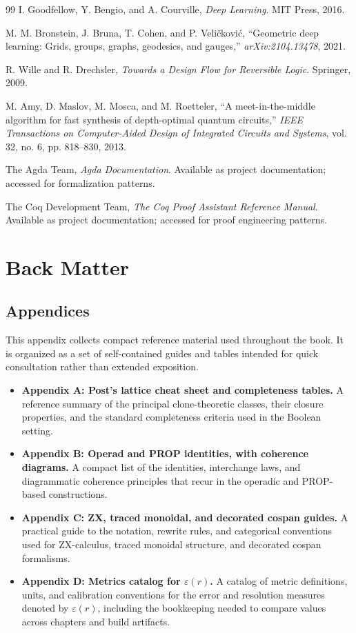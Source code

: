 \documentclass[11pt]{article}
\begin{document}
\begin{thebibliography}{99}
 I. Goodfellow, Y. Bengio, and A. Courville, \emph{Deep Learning}. MIT Press, 2016.

 M. M. Bronstein, J. Bruna, T. Cohen, and P. Veli\v{c}kovi\'c, ``Geometric deep learning: Grids, groups, graphs, geodesics, and gauges,'' \emph{arXiv:2104.13478}, 2021.

 R. Wille and R. Drechsler, \emph{Towards a Design Flow for Reversible Logic}. Springer, 2009.

 M. Amy, D. Maslov, M. Mosca, and M. Roetteler, ``A meet-in-the-middle algorithm for fast synthesis of depth-optimal quantum circuits,'' \emph{IEEE Transactions on Computer-Aided Design of Integrated Circuits and Systems}, vol. 32, no. 6, pp. 818--830, 2013.

 The Agda Team, \emph{Agda Documentation}. Available as project documentation; accessed for formalization patterns.

 The Coq Development Team, \emph{The Coq Proof Assistant Reference Manual}. Available as project documentation; accessed for proof engineering patterns.

\end{thebibliography}


\section{Back Matter}

\subsection{Appendices}

This appendix collects compact reference material used throughout the book. It is organized as a set of self-contained guides and tables intended for quick consultation rather than extended exposition.

\begin{itemize}
  \item \textbf{Appendix A: Post's lattice cheat sheet and completeness tables.} A reference summary of the principal clone-theoretic classes, their closure properties, and the standard completeness criteria used in the Boolean setting.
  \item \textbf{Appendix B: Operad and PROP identities, with coherence diagrams.} A compact list of the identities, interchange laws, and diagrammatic coherence principles that recur in the operadic and PROP-based constructions.
  \item \textbf{Appendix C: ZX, traced monoidal, and decorated cospan guides.} A practical guide to the notation, rewrite rules, and categorical conventions used for ZX-calculus, traced monoidal structure, and decorated cospan formalisms.
  \item \textbf{Appendix D: Metrics catalog for $\varepsilon(r)$.} A catalog of metric definitions, units, and calibration conventions for the error and resolution measures denoted by $\varepsilon(r)$, including the bookkeeping needed to compare values across chapters and build artifacts.
\end{itemize}
\end{document}
